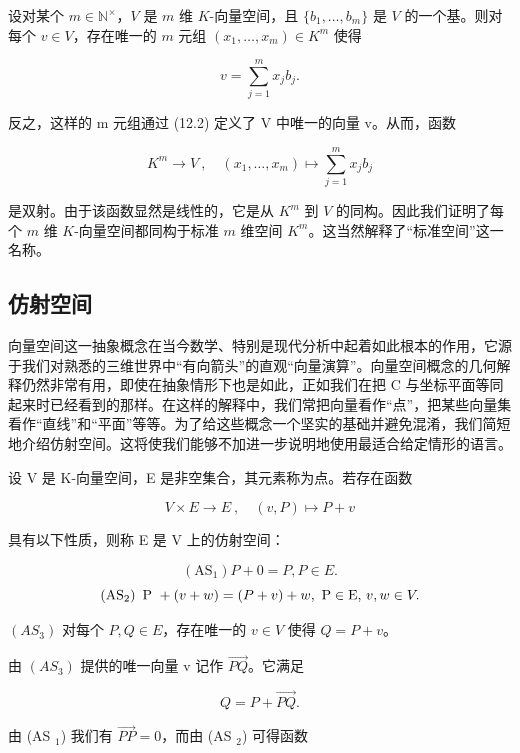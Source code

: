 \begin{remark}

设对某个 $m \in \mathbb{N}^\times$，$V$ 是 $m$ 维 $K$-向量空间，且 $\{b_1, \ldots, b_m\}$ 是 $V$ 的一个基。则对每个 $v \in V$，存在唯一的 $m$ 元组 $(x_1, \ldots, x_m) \in K^m$ 使得

\begin{equation}
v=\sum_{j=1}^{m}x_{j}b_{j}.
\end{equation}

反之，这样的 m 元组通过 (12.2) 定义了 V 中唯一的向量 v。从而，函数

\[
K^{m}\to V~,\quad(x_{1},\ldots,x_{m})\mapsto\textstyle\sum_{j=1}^{m}x_{j}b_{j}
\]

是双射。由于该函数显然是线性的，它是从 $K^{m}$ 到 $V$ 的同构。因此我们证明了每个 $m$ 维 $K$-向量空间都同构于标准 $m$ 维空间 $K^{m}$。这当然解释了“标准空间”这一名称。

\end{remark}

\subsection*{仿射空间}

向量空间这一抽象概念在当今数学、特别是现代分析中起着如此根本的作用，它源于我们对熟悉的三维世界中“有向箭头”的直观“向量演算”。向量空间概念的几何解释仍然非常有用，即使在抽象情形下也是如此，正如我们在把 C 与坐标平面等同起来时已经看到的那样。在这样的解释中，我们常把向量看作“点”，把某些向量集看作“直线”和“平面”等等。为了给这些概念一个坚实的基础并避免混淆，我们简短地介绍仿射空间。这将使我们能够不加进一步说明地使用最适合给定情形的语言。

设 V 是 K-向量空间，E 是非空集合，其元素称为点。若存在函数

\[
V\times E\to E~,\quad(v,P)\mapsto P+v
\]

具有以下性质，则称 E 是 V 上的仿射空间：

\[
\left(\mathrm{A S}_{1}\right)P+0=P,P\in E.
\]
\[
\left(\mathrm{A S}_{2}\right)\mathrm{\boldmath~P~}+\left(v+w\right)=\left(P+v\right)+w,\mathrm{\boldmath~P\in E,~}v,w\in V.
\]

$ (AS_3) $ 对每个  $ P, Q \in E $，存在唯一的  $ v \in V $ 使得  $ Q = P + v $。

由  $ (AS_{3}) $ 提供的唯一向量 v 记作  $ \overrightarrow{PQ} $。它满足

\[
Q=P+\overrightarrow{P Q}.
\]

由 (AS $ _{1} $) 我们有  $ \overrightarrow{PP}=0 $，而由 (AS $ _{2} $) 可得函数

